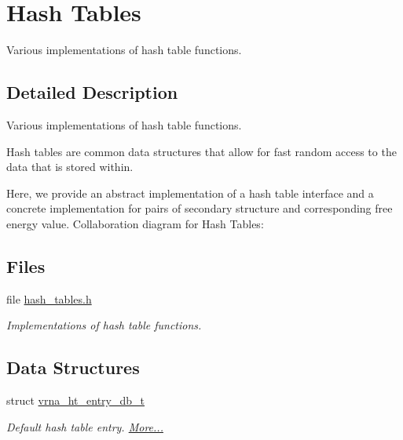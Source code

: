 \hypertarget{group__hash__table__utils}{}\section{Hash Tables}
\label{group__hash__table__utils}


Various implementations of hash table functions.  




\subsection{Detailed Description}
Various implementations of hash table functions. 

Hash tables are common data structures that allow for fast random access to the data that is stored within.

Here, we provide an abstract implementation of a hash table interface and a concrete implementation for pairs of secondary structure and corresponding free energy value. Collaboration diagram for Hash Tables\+:
\subsection*{Files}
\begin{DoxyCompactItemize}
\item 
file \mbox{\hyperlink{hash__tables_8h}{hash\+\_\+tables.\+h}}
\begin{DoxyCompactList}\small\item\em Implementations of hash table functions. \end{DoxyCompactList}\end{DoxyCompactItemize}
\subsection*{Data Structures}
\begin{DoxyCompactItemize}
\item 
struct \mbox{\hyperlink{group__hash__table__utils_structvrna__ht__entry__db__t}{vrna\+\_\+ht\+\_\+entry\+\_\+db\+\_\+t}}
\begin{DoxyCompactList}\small\item\em Default hash table entry.  \mbox{\hyperlink{group__hash__table__utils_structvrna__ht__entry__db__t}{More...}}\end{DoxyCompactList}\end{DoxyCompactItemize}
